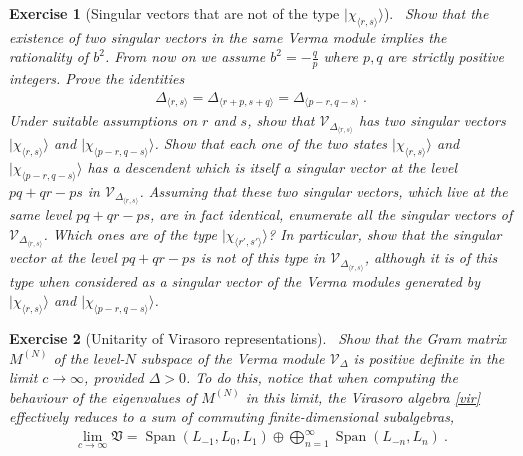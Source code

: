 \documentclass[12pt,a4paper,notitlepage]{report}
\numberwithin{equation}{section}
\theoremstyle{break}
\newtheorem{exo}{Exercise}[chapter]
\begin{document}
\begin{exo}[Singular vectors that are not of the type $|\chi_{\langle r,s \rangle}\rangle$]
 ~\label{exosv}
Show that the existence of two singular vectors in the same Verma module implies the rationality of $b^2$. 
From now on we assume $b^2=-\frac{q}{p}$ where $p,q$ are strictly positive integers.
Prove the identities 
\begin{align}
 \Delta_{\langle r,s \rangle}=\Delta_{\langle r+p,s+q \rangle}=\Delta_{\langle p-r,q-s \rangle}\ .
\end{align}
Under suitable assumptions on $r$ and $s$, show that $\mathcal{V}_{\Delta_{\langle r,s \rangle}}$ has two singular vectors $|\chi_{\langle r,s \rangle}\rangle$ and $|\chi_{\langle p-r,q-s \rangle}\rangle$.
Show that each one of the two states  $|\chi_{\langle r,s \rangle}\rangle$ and $|\chi_{\langle p-r,q-s \rangle}\rangle$ has a descendent which is itself a singular vector at the level $pq+qr-ps$ in $\mathcal{V}_{\Delta_{\langle r,s \rangle}}$.
Assuming that these two singular vectors, which live at the same level $pq+qr-ps$, are in fact identical, enumerate all the singular vectors of $\mathcal{V}_{\Delta_{\langle r,s \rangle}}$.
Which ones are of the type $|\chi_{\langle r',s' \rangle}\rangle$? In particular, show that the singular vector at the level $pq+qr-ps$ is not of this type in $\mathcal{V}_{\Delta_{\langle r,s \rangle}}$, although it is of this type when considered as a singular vector of the Verma modules generated by $|\chi_{\langle r,s \rangle}\rangle$ and $|\chi_{\langle p-r,q-s \rangle}\rangle$.
\end{exo}

\begin{exo}[Unitarity of Virasoro representations]
~\label{exoun}
Show that the Gram matrix $M^{(N)}$ of the level-$N$ subspace of the Verma module $\mathcal{V}_\Delta$ is positive definite in the limit $c\rightarrow \infty$, provided  $\Delta >0$. 
To do this, notice that when computing the behaviour of the eigenvalues of $M^{(N)}$ in this limit, the Virasoro algebra \eqref{vir} effectively reduces to a sum of commuting finite-dimensional subalgebras, 
\begin{align}
 \underset{c\rightarrow \infty}{\lim} \mathfrak{V}  
=  \operatorname{Span}(L_{-1},L_0,L_1) \oplus \bigoplus_{n=1}^\infty \operatorname{Span} (L_{-n}, L_n)\ .
\end{align}
\end{exo}
\end{document}
